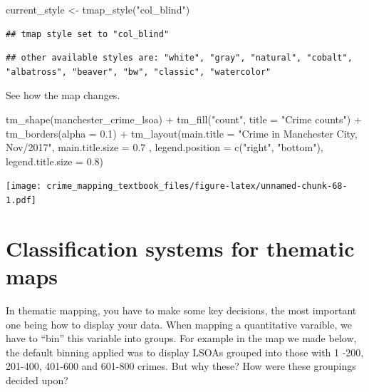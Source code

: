 \documentclass[
]{book}
\newenvironment{Shaded}{\begin{snugshade}}{\end{snugshade}}
\newcommand{\AttributeTok}[1]{\textcolor[rgb]{0.77,0.63,0.00}{#1}}
\newcommand{\FloatTok}[1]{\textcolor[rgb]{0.00,0.00,0.81}{#1}}
\newcommand{\FunctionTok}[1]{\textcolor[rgb]{0.00,0.00,0.00}{#1}}
\newcommand{\NormalTok}[1]{#1}
\newcommand{\OtherTok}[1]{\textcolor[rgb]{0.56,0.35,0.01}{#1}}
\newcommand{\SpecialCharTok}[1]{\textcolor[rgb]{0.00,0.00,0.00}{#1}}
\newcommand{\StringTok}[1]{\textcolor[rgb]{0.31,0.60,0.02}{#1}}
\begin{document}
\begin{Shaded}
\begin{Highlighting}[]
\NormalTok{current\_style }\OtherTok{\textless{}{-}} \FunctionTok{tmap\_style}\NormalTok{(}\StringTok{"col\_blind"}\NormalTok{)}
\end{Highlighting}
\end{Shaded}

\begin{verbatim}
## tmap style set to "col_blind"
\end{verbatim}

\begin{verbatim}
## other available styles are: "white", "gray", "natural", "cobalt", "albatross", "beaver", "bw", "classic", "watercolor"
\end{verbatim}

See how the map changes.

\begin{Shaded}
\begin{Highlighting}[]
\FunctionTok{tm\_shape}\NormalTok{(manchester\_crime\_lsoa) }\SpecialCharTok{+} 
  \FunctionTok{tm\_fill}\NormalTok{(}\StringTok{"count"}\NormalTok{, }\AttributeTok{title =} \StringTok{"Crime counts"}\NormalTok{) }\SpecialCharTok{+}
  \FunctionTok{tm\_borders}\NormalTok{(}\AttributeTok{alpha =} \FloatTok{0.1}\NormalTok{) }\SpecialCharTok{+}
  \FunctionTok{tm\_layout}\NormalTok{(}\AttributeTok{main.title =} \StringTok{"Crime in Manchester City, Nov/2017"}\NormalTok{, }\AttributeTok{main.title.size =} \FloatTok{0.7}\NormalTok{ ,}
            \AttributeTok{legend.position =} \FunctionTok{c}\NormalTok{(}\StringTok{"right"}\NormalTok{, }\StringTok{"bottom"}\NormalTok{), }\AttributeTok{legend.title.size =} \FloatTok{0.8}\NormalTok{)}
\end{Highlighting}
\end{Shaded}

\texttt{[image: crime\_mapping\_textbook\_files/figure-latex/unnamed-chunk-68-1.pdf]}

\hypertarget{classification-systems-for-thematic-maps}{%
\section{Classification systems for thematic maps}\label{classification-systems-for-thematic-maps}}

In thematic mapping, you have to make some key decisions, the most important one being how to display your data. When mapping a quantitative varaible, we have to ``bin'' this variable into groups. For example in the map we made below, the default binning applied was to display LSOAs grouped into those with 1 -200, 201-400, 401-600 and 601-800 crimes. But why these? How were these groupings decided upon?
\end{document}
